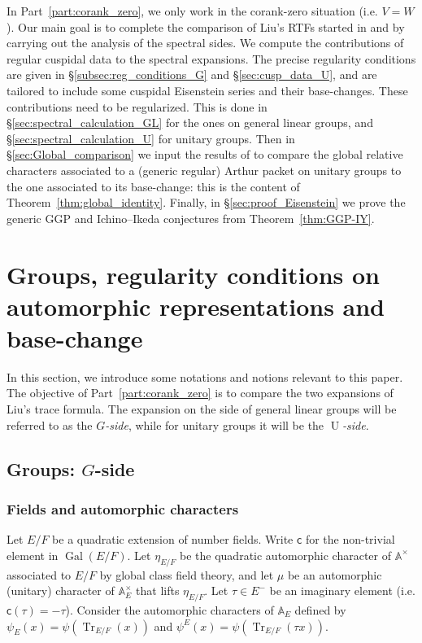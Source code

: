 \documentclass[letterpaper,11pt]{amsart}
\newcommand{\bA}{\mathbb{A}}
\newcommand{\sfc}{\mathsf{c}}
\newcommand{\<}{\negthickspace}
\DeclareMathOperator{\Gal}{Gal}
\DeclareMathOperator{\Tr}{Tr}
\DeclareMathOperator{\U}{U}
\theoremstyle{definition}
\theoremstyle{plain}
\theoremstyle{remark}
\numberwithin{equation}{section}
\begin{document}
In Part~\ref{part:corank_zero}, we only work in the corank-zero situation (i.e. $V=W$). Our main goal is to complete the comparison of Liu's RTFs started in \cite{BLX1} and \cite{BLX2} by carrying out the analysis of the spectral sides. We compute the contributions of regular cuspidal data to the spectral expansions. The precise regularity conditions are given in \S\ref{subsec:reg_conditions_G} and \S\ref{sec:cusp_data_U}, and are tailored to include some cuspidal Eisenstein series and their base-changes. These contributions need to be regularized. This is done in \S\ref{sec:spectral_calculation_GL} for the ones on general linear groups, and \S\ref{sec:spectral_calculation_U} for unitary groups. Then in \S\ref{sec:Global_comparison} we input the results of \cite{BLX2} to compare the global relative characters associated to a (generic regular) Arthur packet on unitary groups to the one associated to its base-change: this is the content of Theorem~\ref{thm:global_identity}. Finally, in \S\ref{sec:proof_Eisenstein} we prove the generic GGP and Ichino--Ikeda conjectures from Theorem~\ref{thm:GGP-IY}.

\section{Groups, regularity conditions on automorphic representations and base-change}
\label{sec:notation}

In this section, we introduce some notations and notions relevant to this paper. The objective of Part~\ref{part:corank_zero} is to compare the two expansions of Liu's trace formula. The expansion on the side of general linear groups will be referred to as the \emph{$G$-side}, while for unitary groups it will be the \emph{$\U$-side}.

\subsection{Groups: $G$-side}

\subsubsection{Fields and automorphic characters}

Let $E/F$ be a quadratic extension of number fields. Write $\sfc$ for the non-trivial element in $\Gal(E/F)$. Let $\eta_{E/F}$ be the quadratic automorphic character of $\bA^\times$ associated to $E/F$ by global class field theory, and let $\mu$ be an automorphic (unitary) character of $\bA_E^\times$ that lifts $\eta_{E/F}$. Let $\tau \in E^-$ be an imaginary element (i.e. $\sfc(\tau)=-\tau$). Consider the automorphic characters of $\bA_E$ defined by $\psi_E(x)=\psi(\Tr_{E/F}(x))$ and $\psi^E(x)=\psi(\Tr_{E/F}(\tau x))$.
\end{document}
